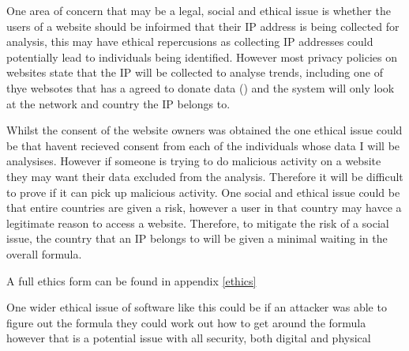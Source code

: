 
One area of concern that may be a legal, social and ethical issue is whether the users of a website should be infoirmed that their IP address is being collected for analysis, this may have ethical repercusions as collecting IP addresses could potentially lead to individuals being identified. However most privacy policies on websites state that the IP will be collected to analyse trends, including one of thye websotes that has a agreed to donate data (\cite{PetersWebPrivacy}) and the system will only look at the network and country the IP belongs to.


Whilst the  consent of the website owners was  obtained the one ethical issue could be that  havent recieved consent from each of the individuals whose data I will be analysises. However if someone is trying to do malicious activity on a website they may want their data excluded from the analysis. Therefore it will be difficult to prove if it can pick up malicious activity. One social and ethical issue could be that entire countries are given a risk, however a user in that country may havce a legitimate reason to access a website. Therefore, to mitigate the risk of a social issue, the country that an IP belongs to will be given a minimal waiting in the overall formula. 

A full ethics  form can be found in appendix \ref{ethics}

One wider ethical issue of software like this could be if an attacker was able to figure out the formula they could work out how to get around the formula however that is a potential issue with all security, both digital and physical